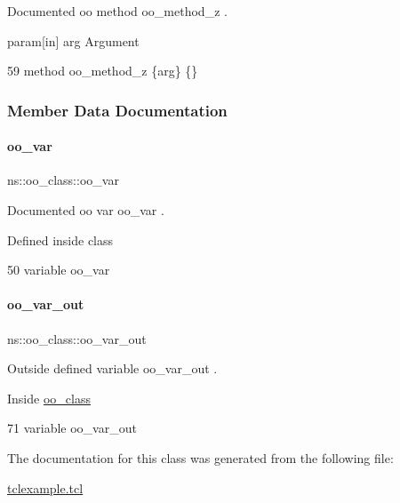 Documented oo method {\ttfamily oo\+\_\+method\+\_\+z} . 

param\mbox{[}in\mbox{]} arg Argument 
\begin{DoxyCode}
59     \textcolor{keyword}{method} oo\_method\_z \{arg\} \{\}
\end{DoxyCode}


\subsubsection{Member Data Documentation}
\mbox{\label{classns_1_1oo__class_a741f11f4a2db3876205658d4a9a279ba}} 
\paragraph{\texorpdfstring{oo\+\_\+var}{oo\_var}}
{\footnotesize\ttfamily ns\+::oo\+\_\+class\+::oo\+\_\+var\hspace{0.3cm}{\ttfamily [static]}}



Documented oo var {\ttfamily oo\+\_\+var} . 

Defined inside class 
\begin{DoxyCode}
50     \textcolor{keyword}{variable} oo\_var
\end{DoxyCode}
\mbox{\label{classns_1_1oo__class_af46293ede16067c38ca2901416cad8ee}} 
\paragraph{\texorpdfstring{oo\+\_\+var\+\_\+out}{oo\_var\_out}}
{\footnotesize\ttfamily ns\+::oo\+\_\+class\+::oo\+\_\+var\+\_\+out\hspace{0.3cm}{\ttfamily [static]}}



Outside defined variable {\ttfamily oo\+\_\+var\+\_\+out} . 

Inside \hyperlink{classns_1_1oo__class}{oo\+\_\+class} 
\begin{DoxyCode}
71   \textcolor{keyword}{variable} oo\_var\_out
\end{DoxyCode}


The documentation for this class was generated from the following file\+:\begin{DoxyCompactItemize}
\item 
\hyperlink{tclexample_8tcl}{tclexample.\+tcl}\end{DoxyCompactItemize}
